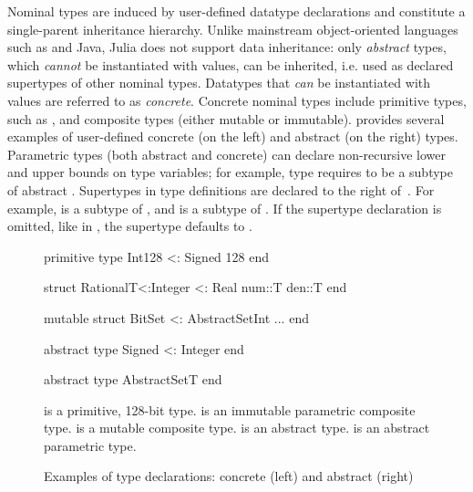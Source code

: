 Nominal types are induced by user-defined datatype declarations and constitute
a single-parent inheritance hierarchy.
Unlike mainstream object-oriented languages such as \CSharp and Java,
Julia does not support data inheritance: only \emph{abstract} types,
which \emph{cannot} be instantiated with values, can be inherited,
i.e. used as declared supertypes of other nominal types.
Datatypes that \emph{can} be instantiated with values are referred to as
\emph{concrete}. Concrete nominal types include primitive types,
such as , and composite  types (either mutable or
immutable).
 provides several examples of user-defined
concrete (on the left) and abstract (on the right) types.
Parametric types (both abstract and concrete) 
can declare non-recursive lower and upper bounds on type variables;
for example, type  requires  to be a subtype of
abstract .
Supertypes in type definitions are declared to the right of~\cjl{<:}.
For example,  is a subtype of , and  is a
subtype of . If the supertype declaration is omitted, like in
, the supertype defaults to .

\begin{figure}[t] 
\begin{minipage}{5.5cm}
\begin{julia}
primitive type Int128 <: Signed 128
end

struct Rational{T<:Integer} <: Real
  num::T
  den::T
end

mutable struct
  BitSet <: AbstractSet{Int}
  ...
end
\end{julia}
\end{minipage}
\hspace{1.2cm}
\begin{minipage}{4.8cm}
\begin{julia}
abstract type Signed <: Integer
end

abstract type AbstractSet{T}
end
\end{julia}
\end{minipage}
\caption{Examples of type declarations: concrete (left) and abstract (right)
}\label{fig:code:user-def-types}
\begin{tablenotes}[para]
\small
   is a primitive, 128-bit type.
   is an immutable parametric composite type.
   is a mutable composite type.
   is an abstract type.
   is an abstract parametric type.
\end{tablenotes}
\end{figure}

